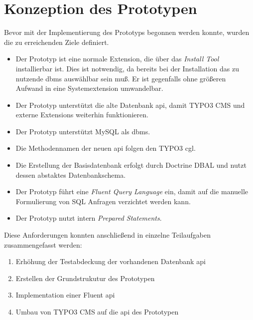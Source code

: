 \section{Konzeption des Prototypen}
\label{prototype:sec:concept}
Bevor mit der Implementierung des Prototyps begonnen werden konnte, wurden die zu erreichenden Ziele definiert.

\begin{itemize}
\item  Der Prototyp ist eine normale Extension, die über das \textit{Install Tool} installierbar ist. Dies ist notwendig, da bereits bei der Installation das zu nutzende \gls{dbms} auswählbar sein muß. Er ist gegenfalls ohne größeren Aufwand in eine Systemextension umwandelbar.

\item Der Prototyp unterstützt die alte Datenbank \gls{api}, damit TYPO3 CMS und externe Extensions weiterhin funktionieren.
\item Der Prototyp unterstützt MySQL als \gls{dbms}.
\item Die Methodennamen der neuen \gls{api} folgen den TYPO3 \gls{cgl}.
\item Die Erstellung der Basisdatenbank erfolgt durch Doctrine DBAL und nutzt dessen abstaktes Datenbankschema.
\item Der Prototyp führt eine \textit{Fluent Query Language} ein, damit auf die manuelle Formulierung von SQL Anfragen verzichtet werden kann.
\item Der Prototyp nutzt intern \textit{Prepared Statements}.
\end{itemize}

Diese Anforderungen konnten anschließend in einzelne Teilaufgaben zusammengefasst werden:

\begin{enumerate}
\item Erhöhung der Testabdeckung der vorhandenen Datenbank \gls{api}
\item Erstellen der Grundstrukutur des Prototypen
\item Implementation einer Fluent \gls{api}
\item Umbau von TYPO3 CMS auf die \gls{api} des Prototypen
\end{enumerate}

